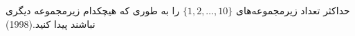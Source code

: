 حداکثر تعداد زیرمجموعه‌های $\{1, 2, \dots, 10\}$ را به طوری که هیچکدام زیرمجموعه دیگری نباشند پیدا کنید.(1998)